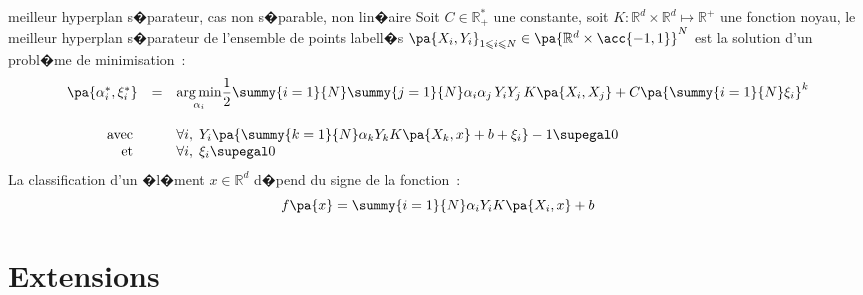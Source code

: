             \begin{xproblem}{meilleur hyperplan s�parateur, cas non s�parable, non lin�aire}\label{svm_problem_def_4}
            Soit $C \in \mathbb{R}^*_+$ une constante, soit $K : \mathbb{R}^d \times \mathbb{R}^d \longmapsto \mathbb{R}^+$ une fonction noyau,
            le meilleur hyperplan s�parateur de l'ensemble de points labell�s
            $\pa{X_i,Y_i}_{1 \leqslant i \leqslant N} \in \pa{ \mathbb{R}^d \times \acc{-1,1} }^N$ est la solution
            d'un probl�me de minimisation~: 
                    $$
                    \begin{array}{rcl}    \pa{\alpha_i^*, \xi_i^*} &=& \underset{\alpha_i}{\arg \min} \dfrac{1}{2}  
                                                                                    \summy{i=1}{N}\summy{j=1}{N}
                                                                                            \alpha_i \alpha_j \,
                                                                                            Y_i Y_j \,
                                                                                            K\pa{X_i,X_j}
                                                                                    + C \pa{\summy{i=1}{N} \xi_i}^k \\ \\
                                         \text{avec }      && \forall i, \;  Y_i \pa{ \summy{k=1}{N} \alpha_k Y_k K\pa{X_k,x} + b + \xi_i } - 1 \supegal 0 \\
                                         \text{et }            && \forall i, \; \xi_i \supegal 0 
                    \end{array}                                        
                    $$
            La classification d'un �l�ment $x \in \mathbb{R}^d$ d�pend du signe de la fonction~:
                    $$
                    f\pa{x} = \summy{i=1}{N} \alpha_i Y_i K\pa{X_i,x} + b
                    $$
            \end{xproblem}
            
            
\section{Extensions}

